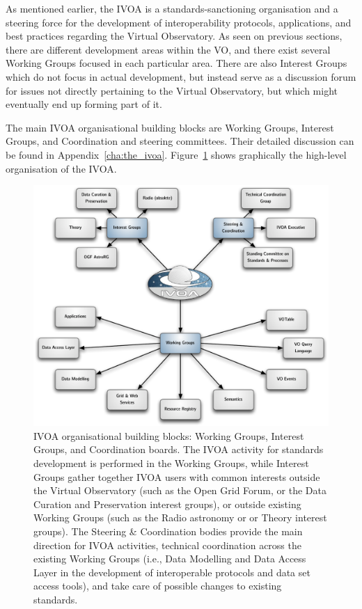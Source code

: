 		 As mentioned earlier, the IVOA is a standards-sanctioning
		organisation and a steering force for the development of
		interoperability protocols, applications, and best
		practices regarding the Virtual Observatory. As seen on
		previous sections, there are different development areas
		within the VO, and there exist several Working Groups
		focused in each particular area. There are also Interest
		Groups which do not focus in actual development, but
		instead serve as a discussion forum for issues not directly
		pertaining to the Virtual Observatory, but which might
		eventually end up forming part of it.

		 The main IVOA organisational building blocks are Working
		Groups, Interest Groups, and Coordination and steering
		committees. Their detailed discussion can be found in
		Appendix~\ref{cha:the_ivoa}.
		Figure~\ref{OrganisationalBuildingBlocksIVOA} shows
		graphically the high-level organisation of the IVOA.
		
		\begin{figure}[tbp]
			\centering
				\includegraphics[width=\columnwidth]
				{fig/OrganisationalBuildingBlocksIVOA.pdf}
			\caption[IVOA organisational building blocks]{
				IVOA organisational building blocks: Working
				Groups, Interest Groups, and Coordination boards.
				The IVOA activity for standards development is
				performed in the Working Groups, while Interest
				Groups gather together IVOA users with common
				interests outside the Virtual Observatory (such as
				the Open Grid Forum, or the Data Curation and
				Preservation interest groups), or outside existing
				Working Groups (such as the Radio astronomy or or
				Theory interest groups). The Steering \&
				Coordination bodies provide the main direction for
				IVOA activities, technical coordination across the
				existing Working Groups (i.e., Data Modelling and
				Data Access Layer in the development of
				interoperable protocols and data set access tools),
				and take care of possible changes to existing
				standards.
			}
			\label{OrganisationalBuildingBlocksIVOA}
		\end{figure}
		
